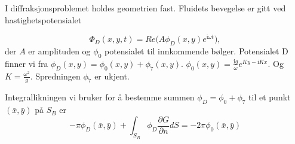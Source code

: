 I diffraksjonsproblemet holdes geometrien fast. Fluidets bevegelse er gitt ved hastighetspotensialet

\begin{equation}
\Phi_D(x,y,t) = Re\Big(A  \phi_D(x,y) e^{\mathrm{i} \omega t} \Big), 
\end{equation}
der $A$ er amplituden og $\phi_0$ potensialet til innkommende bølger. Potensialet D finner vi fra $\phi_D(x,y) =  \phi_0(x,y) +  \phi_7(x,y)$. 
$\phi_0(x,y) = \frac{\mathrm{i} g}{\omega}e^{Ky -\mathrm{i} K x}$. Og $K = \frac{\omega^2}{g}$. Spredningen $\phi_7$ er ukjent.

Integrallikningen vi bruker for å bestemme summen $\phi_D =  \phi_0 +  \phi_7$ til et punkt $(\bar{x},\bar{y})$ på $S_B$ er
\begin{equation}
    -\pi \phi_D(\bar{x},\bar{y})  + \int_{S_B}   \phi_D  \frac{\partial G }{\partial n}dS = -2\pi \phi_0(\bar{x},\bar{y}) 
\end{equation}


